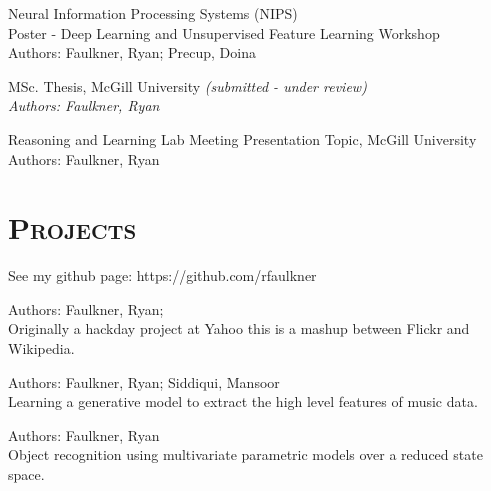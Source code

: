 \begin{resume}
\begin{position}
Neural Information Processing Systems (NIPS) \\
Poster - Deep Learning and Unsupervised Feature Learning Workshop \\
Authors: Faulkner, Ryan; Precup, Doina
\end{position}

\begin{position}
MSc. Thesis, McGill University \itshape{(submitted - under review)} \\
Authors: Faulkner, Ryan
\end{position}

\begin{position}
Reasoning and Learning Lab Meeting Presentation Topic, McGill University \\
Authors: Faulkner, Ryan
\end{position}

\section{\textsc{Projects}}

See my github page: https://github.com/rfaulkner

\begin{position}
Authors: Faulkner, Ryan; \\
Originally a hackday project at Yahoo this is a mashup between Flickr and Wikipedia.
\end{position}

\begin{position}
Authors: Faulkner, Ryan; Siddiqui, Mansoor \\
Learning a generative model to extract the high level features of music data.
\end{position}

\begin{position}
Authors: Faulkner, Ryan \\
Object recognition using multivariate parametric models over a reduced state space. 
\end{position}


\end{resume}
